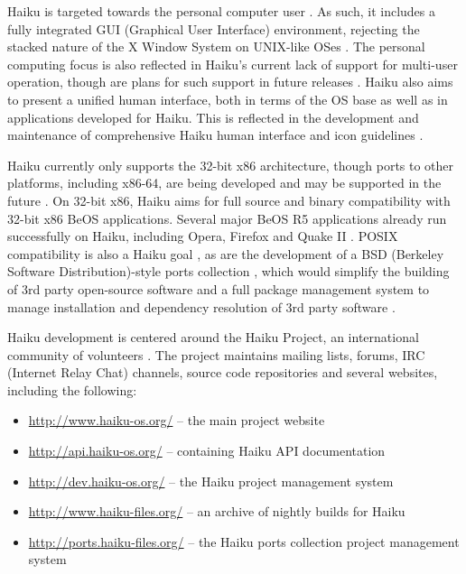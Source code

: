 \documentclass{article}
\begin{document}
Haiku is targeted towards the personal computer user
\cite{HaikuAbout}.  As such, it includes a fully integrated GUI
(Graphical User Interface) environment, rejecting the stacked nature
of the X Window System on UNIX-like OSes \cite{HaikuFaq}.  The
personal computing focus is also reflected in Haiku's current lack of
support for multi-user operation, though are plans for such support in
future releases \cite{HaikuFuture}.  Haiku also aims to present a
unified human interface, both in terms of the OS base as well as in
applications developed for Haiku.  This is reflected in the
development and maintenance of comprehensive Haiku human interface and
icon guidelines \cite{HaikuHIG, HaikuIcon}.

Haiku currently only supports the 32-bit x86 architecture, though
ports to other platforms, including x86-64, are being developed and
may be supported in the future \cite{HaikuFaq}.  On 32-bit x86, Haiku
aims for full source and binary compatibility with 32-bit x86 BeOS
applications.  Several major BeOS R5 applications already run
successfully on Haiku, including Opera, Firefox and Quake II
\cite{HaikuWiki}.  POSIX compatibility is also a Haiku goal
\cite{HaikuFuture, HaikuIncContracts}, as are the development of a
BSD (Berkeley Software Distribution)-style ports
collection \cite{HaikuPorts}, which would simplify the building of 3rd
party open-source software and a full package management system to
manage installation and dependency resolution of 3rd party
software \cite{HaikuR1A3Notes}.

Haiku development is centered around the Haiku Project, an
international community of volunteers \cite{HaikuAbout}.  The project
maintains mailing lists, forums, IRC (Internet Relay Chat)
channels, \cite{HaikuComm} source code repositories \cite{HaikuGetSvn}
and several websites, including the following:
\begin{itemize}
  \item \url{http://www.haiku-os.org/} -- the main project website
  \item \url{http://api.haiku-os.org/} -- containing Haiku API documentation
  \item \url{http://dev.haiku-os.org/} -- the Haiku project management
    system
  \item \url{http://www.haiku-files.org/} -- an archive of nightly
    builds for Haiku
  \item \url{http://ports.haiku-files.org/} -- the Haiku ports collection
    project management system
\end{itemize}
\end{document}
